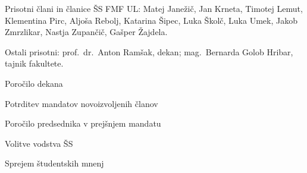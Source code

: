 \documentclass{seja}
\begin{document}
Prisotni člani in članice ŠS FMF UL:
Matej Janežič,
Jan Krneta,
Timotej Lemut,
Klementina Pirc,
Aljoša Rebolj,
Katarina Šipec,
Luka Školč,
Luka Umek,
Jakob Zmrzlikar,
Nastja Zupančič,
Gašper Žajdela.

Ostali prisotni: prof.~dr.~Anton Ramšak, dekan; mag.~Bernarda Golob Hribar, tajnik fakultete.

\begin{red*}
	\item Poročilo dekana
	\item Potrditev mandatov novoizvoljenih članov
	\item Poročilo predsednika v prejšnjem mandatu
	\item Volitve vodstva ŠS
	\item Sprejem študentskih mnenj
\end{red*}
\end{document}
